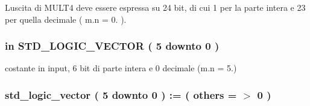 L\textquotesingle{}uscita di M\+U\+L\+T4 deve essere espressa su 24 bit, di cui 1 per la parte intera e 23 per quella decimale ( m.\+n = 0. ). 

\subsubsection[{\texorpdfstring{prim}{prim}}]{ {\bfseries \textcolor{vhdlchar}{in}\textcolor{vhdlchar}{ }} {\bfseries \textcolor{vhdlchar}{S\+T\+D\+\_\+\+L\+O\+G\+I\+C\+\_\+\+V\+E\+C\+T\+OR}\textcolor{vhdlchar}{ }\textcolor{vhdlchar}{(}\textcolor{vhdlchar}{ }\textcolor{vhdlchar}{ } \textcolor{vhdldigit}{5} \textcolor{vhdlchar}{ }\textcolor{vhdlchar}{downto}\textcolor{vhdlchar}{ }\textcolor{vhdlchar}{ } \textcolor{vhdldigit}{0} \textcolor{vhdlchar}{ }\textcolor{vhdlchar}{)}\textcolor{vhdlchar}{ }} \hspace{0.3cm}{\ttfamily [Port]}}\hypertarget{group___linear_regression_ga334647776cbf92a6f58a9e709678a597}{}\label{group___linear_regression_ga334647776cbf92a6f58a9e709678a597}


costante in input, 6 bit di parte intera e 0 decimale (m.\+n = 5.) 

\subsubsection[{\texorpdfstring{prim\+\_\+buff0}{prim_buff0}}]{ {\bfseries \textcolor{vhdlchar}{std\+\_\+logic\+\_\+vector}\textcolor{vhdlchar}{ }\textcolor{vhdlchar}{(}\textcolor{vhdlchar}{ }\textcolor{vhdlchar}{ } \textcolor{vhdldigit}{5} \textcolor{vhdlchar}{ }\textcolor{vhdlchar}{downto}\textcolor{vhdlchar}{ }\textcolor{vhdlchar}{ } \textcolor{vhdldigit}{0} \textcolor{vhdlchar}{ }\textcolor{vhdlchar}{)}\textcolor{vhdlchar}{ }\textcolor{vhdlchar}{ }\textcolor{vhdlchar}{ }\textcolor{vhdlchar}{\+:}\textcolor{vhdlchar}{=}\textcolor{vhdlchar}{ }\textcolor{vhdlchar}{(}\textcolor{vhdlchar}{ }\textcolor{vhdlchar}{ }\textcolor{vhdlchar}{others}\textcolor{vhdlchar}{ }\textcolor{vhdlchar}{ }\textcolor{vhdlchar}{=}\textcolor{vhdlchar}{ }\textcolor{vhdlchar}{$>$}\textcolor{vhdlchar}{ }\textcolor{vhdlchar}{\textquotesingle{}}\textcolor{vhdlchar}{ } \textcolor{vhdldigit}{0} \textcolor{vhdlchar}{ }\textcolor{vhdlchar}{\textquotesingle{}}\textcolor{vhdlchar}{ }\textcolor{vhdlchar}{)}\textcolor{vhdlchar}{ }} \hspace{0.3cm}{\ttfamily [Signal]}}\hypertarget{group___linear_regression_ga2f2ba1395426f682c5257c7549946eba}{}\label{group___linear_regression_ga2f2ba1395426f682c5257c7549946eba}



